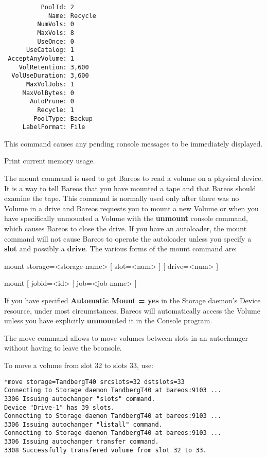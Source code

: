 \begin{description}
{\begin{verbatim}
          PoolId: 2
            Name: Recycle
         NumVols: 0
         MaxVols: 8
         UseOnce: 0
      UseCatalog: 1
 AcceptAnyVolume: 1
    VolRetention: 3,600
  VolUseDuration: 3,600
      MaxVolJobs: 1
     MaxVolBytes: 0
       AutoPrune: 0
         Recycle: 1
        PoolType: Backup
     LabelFormat: File

\end{verbatim}
\normalsize

\item [messages]
   This command causes any pending  console messages to be immediately displayed.

\item [memory]
   Print current memory usage.


\item [mount]
   The mount command is used to get Bareos to read a volume on a physical
   device.  It is a way to tell Bareos that you have mounted a tape and
   that Bareos should examine the tape.  This command is normally
   used only after there was no Volume in a drive and Bareos requests you to mount a new
   Volume or when you have specifically unmounted a Volume with the {\bf
   unmount} console command, which causes Bareos to close the drive.  If
   you have an autoloader, the mount command will not cause Bareos to
   operate the autoloader unless you specify a {\bf slot} and possibly a
   {\bf drive}. The various forms of the mount command are:

mount  storage={\textless}storage-name{\textgreater} [ slot={\textless}num{\textgreater} ] [
       drive={\textless}num{\textgreater} ]

mount [ jobid={\textless}id{\textgreater} |  job={\textless}job-name{\textgreater} ]

   If you have specified {\bf Automatic  Mount = yes} in the Storage daemon's
   Device resource,  under most circumstances, Bareos will automatically access
   the Volume unless you have explicitly {\bf unmount}ed it in  the Console
   program.

\item [move]
   The move command allows to move volumes between slots in an autochanger without
   having to leave the bconsole.

   To move a volume from slot 32 to slots 33, use:

\footnotesize
\begin{verbatim}
*move storage=TandbergT40 srcslots=32 dstslots=33
Connecting to Storage daemon TandbergT40 at bareos:9103 ...
3306 Issuing autochanger "slots" command.
Device "Drive-1" has 39 slots.
Connecting to Storage daemon TandbergT40 at bareos:9103 ...
3306 Issuing autochanger "listall" command.
Connecting to Storage daemon TandbergT40 at bareos:9103 ...
3306 Issuing autochanger transfer command.
3308 Successfully transfered volume from slot 32 to 33.
\end{verbatim}
\normalsize

}
\end{description}
